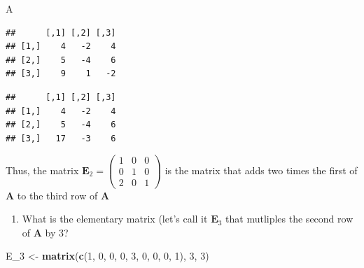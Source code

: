 \documentclass[
]{book}
\newenvironment{Shaded}{\begin{snugshade}}{\end{snugshade}}
\newcommand{\CommentTok}[1]{\textcolor[rgb]{0.56,0.35,0.01}{\textit{#1}}}
\newcommand{\DecValTok}[1]{\textcolor[rgb]{0.00,0.00,0.81}{#1}}
\newcommand{\KeywordTok}[1]{\textcolor[rgb]{0.13,0.29,0.53}{\textbf{#1}}}
\newcommand{\NormalTok}[1]{#1}
\newcommand{\OperatorTok}[1]{\textcolor[rgb]{0.81,0.36,0.00}{\textbf{#1}}}
\newcommand{\StringTok}[1]{\textcolor[rgb]{0.31,0.60,0.02}{#1}}
\providecommand{\tightlist}{%
  \setlength{\itemsep}{0pt}\setlength{\parskip}{0pt}}
\theoremstyle{definition}
\theoremstyle{definition}
\theoremstyle{definition}
\theoremstyle{definition}
\theoremstyle{remark}
\begin{document}
\begin{itemize}
\begin{Shaded}
\begin{Highlighting}[]
\NormalTok{A}
\end{Highlighting}
\end{Shaded}

\begin{verbatim}
##      [,1] [,2] [,3]
## [1,]    4   -2    4
## [2,]    5   -4    6
## [3,]    9    1   -2
\end{verbatim}

\begin{Shaded}
\end{Shaded}

\begin{verbatim}
##      [,1] [,2] [,3]
## [1,]    4   -2    4
## [2,]    5   -4    6
## [3,]   17   -3    6
\end{verbatim}

  Thus, the matrix \(\mathbf{E}_2 = \begin{pmatrix} 1 & 0 & 0 \\ 0 & 1 & 0 \\ 2 & 0 & 1 \end{pmatrix}\) is the matrix that adds two times the first of \(\mathbf{A}\) to the third row of \(\mathbf{A}\)

  \begin{enumerate}
  \def\labelenumi{\arabic{enumi})}
  \setcounter{enumi}{2}
  \tightlist
  \item
    What is the elementary matrix (let's call it \(\mathbf{E}_3\) that mutliples the second row of \(\mathbf{A}\) by 3?
  \end{enumerate}

\begin{Shaded}
\begin{Highlighting}[]
\NormalTok{E_}\DecValTok{3}\NormalTok{ <-}\StringTok{ }\KeywordTok{matrix}\NormalTok{(}\KeywordTok{c}\NormalTok{(}\DecValTok{1}\NormalTok{, }\DecValTok{0}\NormalTok{, }\DecValTok{0}\NormalTok{, }\DecValTok{0}\NormalTok{, }\DecValTok{3}\NormalTok{, }\DecValTok{0}\NormalTok{, }\DecValTok{0}\NormalTok{, }\DecValTok{0}\NormalTok{, }\DecValTok{1}\NormalTok{), }\DecValTok{3}\NormalTok{, }\DecValTok{3}\NormalTok{)}
\end{Highlighting}
\end{Shaded}


\end{itemize}
\end{document}
